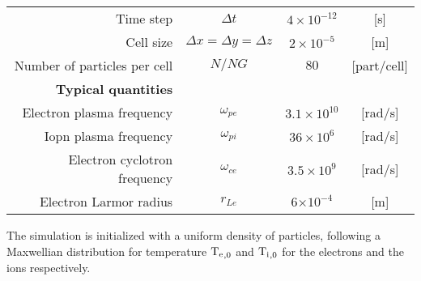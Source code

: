 \begin{table}[htbp]
\begin{tabular}{@{}r c c c@{}}
          Time step & $\Delta t  $                      & $4 \times 10^{-12}$ & [{s}] \\
          Cell size & $\Delta x = \Delta y = \Delta z $ & $2 \times 10^{-5}$  & [{m}] \\
          Number of particles per cell & $N/NG      $                      & $80$                & [{part/cell}] \\
          \midrule
          {\bf Typical quantities} &  &  &  \\ 
          Electron plasma frequency & $\omega_{pe}$               & $3.1 \times 10^{10} $  & [rad/s]\\
          Iopn plasma frequency & $\omega_{pi}$               & $36 \times 10^{6} $  & [rad/s]\\
          Electron cyclotron frequency & $\omega_{ce}$               &  $3.5\times 10^{9}$  & [rad/s] \\
          Electron Larmor radius & $r_{Le}$                    & 6$\times 10^{-4}$    & [m] \\
          \bottomrule
       \end{tabular}
    \end{table}
  
  
  The simulation is initialized with a uniform density of particles, following a Maxwellian distribution for temperature $\mathrm{T_e}_{,0}$ and $\mathrm{T_i}_{,0}$ for the electrons and the ions respectively.
  
  